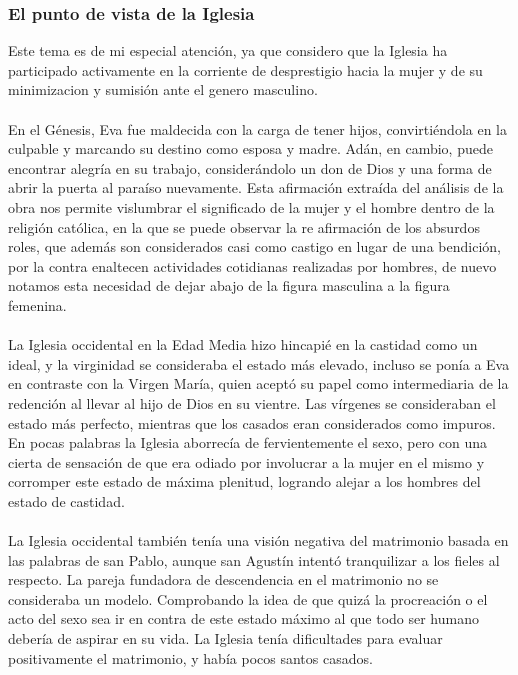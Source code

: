 \documentclass{report}
\begin{document}
\subsubsection{El punto de vista de la Iglesia}
Este tema es de mi especial atención, ya que considero que la Iglesia ha participado activamente en la corriente de desprestigio hacia la mujer y de su minimizacion y sumisión ante el genero masculino. 
\\\\
En el Génesis, Eva fue maldecida con la carga de tener hijos, convirtiéndola en la culpable y marcando su destino como esposa y madre. Adán, en cambio, puede encontrar alegría en su trabajo, considerándolo un don de Dios y una forma de abrir la puerta al paraíso nuevamente. Esta afirmación extraída del análisis de la obra nos permite vislumbrar el significado de la mujer y el hombre dentro de la religión católica, en la que se puede observar la re afirmación de los absurdos roles, que además son considerados casi como castigo en lugar de una bendición, por la contra enaltecen actividades cotidianas realizadas por hombres, de nuevo notamos esta necesidad de dejar abajo de la figura masculina a la figura femenina. 
\\\\
La Iglesia occidental en la Edad Media hizo hincapié en la castidad como un ideal, y la virginidad se consideraba el estado más elevado, incluso se ponía a Eva en contraste con la Virgen María, quien aceptó su papel como intermediaria de la redención al llevar al hijo de Dios en su vientre. Las vírgenes se consideraban el estado más perfecto, mientras que los casados eran considerados como impuros. En pocas palabras la Iglesia aborrecía de fervientemente el sexo, pero con una cierta de sensación de que era odiado por involucrar a la mujer en el mismo y corromper este estado de máxima plenitud, logrando alejar a los hombres del estado de castidad. 
\\\\
La Iglesia occidental también tenía una visión negativa del matrimonio basada en las palabras de san Pablo, aunque san Agustín intentó tranquilizar a los fieles al respecto. La pareja fundadora de descendencia en el matrimonio no se consideraba un modelo. Comprobando la idea de que quizá la procreación o el acto del sexo sea ir en contra de este estado máximo al que todo ser humano debería de aspirar en su vida. La Iglesia tenía dificultades para evaluar positivamente el matrimonio, y había pocos santos casados.
\\\\
\end{document}

